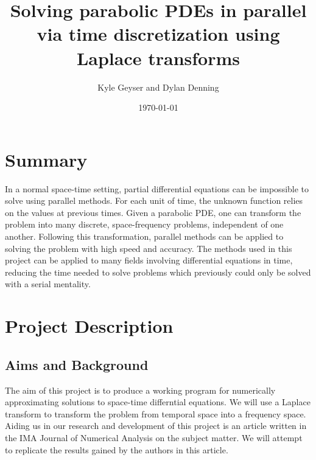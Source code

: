 \documentclass[letterpaper, 12pt]{article}
\title{Solving parabolic PDEs in parallel via time discretization using Laplace transforms}
\author{Kyle Geyser and Dylan Denning}
\date{\today}
\begin{document}
 \maketitle
	
	\section*{Summary}
	\hspace{5mm} In a normal space-time setting, partial differential equations can be impossible to solve using parallel methods. For each unit of time, the unknown function relies on the values at previous times. Given a parabolic PDE, one can transform the problem into many discrete, space-frequency problems, independent of one another. Following this transformation, parallel methods can be applied to solving the problem with high speed and accuracy. The methods used in this project can be applied to many fields involving differential equations in time, reducing the time needed to solve problems which previously could only be solved with a serial mentality.
	
	\section*{Project Description}
	\subsection*{Aims and Background}
	\hspace{5mm} The aim of this project is to produce a working program for numerically approximating solutions to space-time differntial equations. We will use a Laplace transform to transform the problem from temporal space into a frequency space. Aiding us in our research and development of this project is an article\cite{sheen03} written in the IMA Journal of Numerical Analysis on the subject matter. We will attempt to replicate the results gained by the authors in this article.
	
\end{document}

